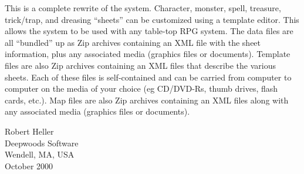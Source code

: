 This is a complete rewrite of the system.  Character, monster, spell, treasure,
trick/trap, and dreasing ``sheets'' can be customized using a template
editor.  This allows the system to be used with any table-top RPG
system.  The data files are all ``bundled'' up as Zip archives
containing an XML file with the sheet information, plus any associated
media (graphics files or documents).  Template files are also Zip
archives containing an XML files that describe the various sheets.  Each
of these files is self-contained and can be carried from computer to
computer on the media of your choice (eg CD/DVD-Rs, thumb drives, flash
cards, etc.).  Map files are also Zip archives containing an XML files
along with any associated media (graphics files or documents).

\vspace{.25in}
\noindent
Robert Heller \\
Deepwoods Software \\
Wendell, MA, USA \\
October 2000
